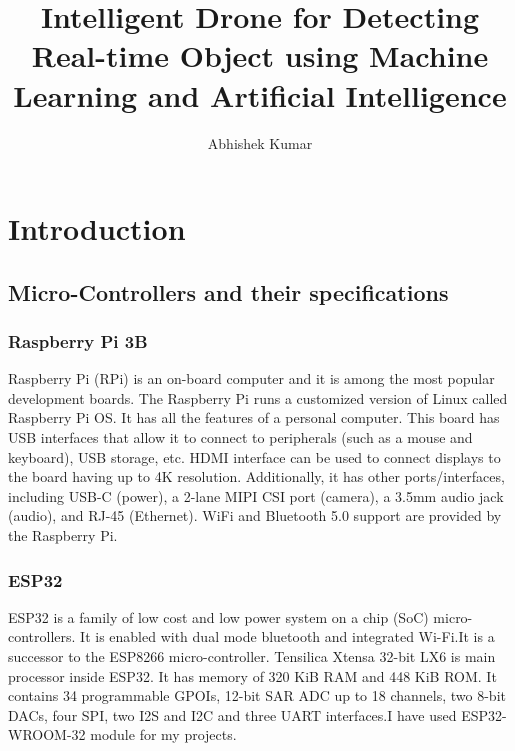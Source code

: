 \documentclass[a4paper,twoside]{iiththesis}
\title{Intelligent Drone for Detecting Real-time Object using Machine Learning and Artificial Intelligence}
\author{Abhishek Kumar}
\begin{document}
\chapter{Introduction}
\section{Micro-Controllers and their specifications}
\subsection{Raspberry Pi 3B}
\par  Raspberry Pi (RPi) is an on-board computer and it is among the most popular development boards. The Raspberry Pi runs a customized version of Linux called Raspberry Pi OS. It has all the features of a personal computer. This board has USB interfaces that allow it to connect to peripherals (such as a mouse and keyboard), USB storage, etc. HDMI interface can be used to connect displays to the board having up to 4K resolution. Additionally, it has other ports/interfaces, including USB-C (power), a 2-lane MIPI CSI port (camera), a 3.5mm audio jack (audio), and RJ-45 (Ethernet). WiFi and Bluetooth 5.0 support are provided by the Raspberry Pi.
\subsection{ESP32} 
\par  ESP32 is a family of low cost and low power system on a chip (SoC) micro-controllers. It is enabled with dual mode bluetooth and integrated Wi-Fi.It is a successor to the ESP8266 micro-controller. Tensilica Xtensa 32-bit LX6 is main processor inside ESP32. It has memory of 320 KiB RAM and 448 KiB ROM. It contains 34 programmable GPOIs, 12-bit SAR ADC up to 18 channels, two 8-bit DACs, four SPI, two I2S and I2C and three UART interfaces.I have used ESP32-WROOM-32 module for my projects.
\end{document}

